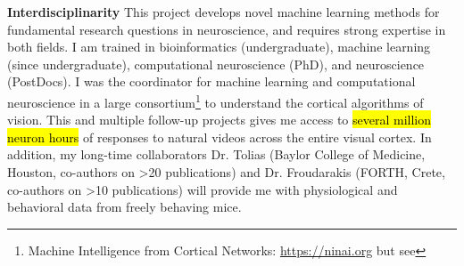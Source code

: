 \documentclass[COG,11pt]{ercgrant}
\begin{document}
\textbf{Interdisciplinarity} This project develops novel machine learning methods for fundamental research questions in neuroscience, and requires strong expertise in both fields. 
I am trained in bioinformatics (undergraduate), machine learning (since undergraduate), computational neuroscience (PhD), and neuroscience (PostDocs). 
I was the coordinator for machine learning and computational neuroscience in a large consortium\footnote{Machine Intelligence from Cortical Networks: \url{https://ninai.org} but see } to understand the cortical algorithms of vision.
This and multiple follow-up projects gives me access to \hl{several million neuron hours} of responses to natural videos across the entire visual cortex. In addition, my long-time collaborators Dr. Tolias (Baylor College of Medicine, Houston, co-authors on >20  publications) and Dr. Froudarakis (FORTH, Crete, co-authors on >10 publications) will provide me with physiological and behavioral data from freely behaving mice. 
\end{document}
